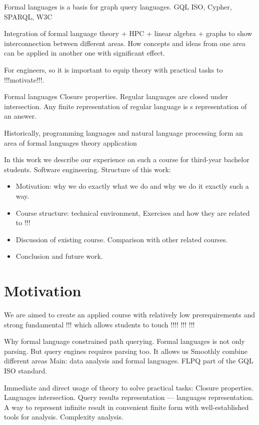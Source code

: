 \documentclass[sigconf]{acmart}
\begin{document}
Formal languages is a basis for graph query languages. 
GQL ISO, Cypher, SPARQL, W3C 

Integration of formal language theory + HPC + linear algebra + graphs to show interconnection between different areas.
How concepts and ideas from one area can be applied in another one with significant effect. 

For engineers, so it is important to equip theory with practical tasks to !!!motivate!!!. 

Formal languages Closure properties. Regular languages are closed under intersection. Any finite representation of regular language is s representation of an answer.

Historically, programming languages and natural language processing form an area of formal languages theory application 

In this work we describe our experience on such a course for third-year bachelor students.
Software engineering.
Structure of this work:
\begin{itemize}
  \item Motivation: why we do exactly what we do and why we do it exactly such a way. 
  \item Course structure: technical environment, Exercises and how they are related to !!!
  \item Discussion of existing course. Comparison with other related courses.
  \item Conclusion and future work.
\end{itemize}  

\section{Motivation}

We are aimed to create an applied course with relatively low prerequirements and strong fundamental !!! which allows students to touch !!!! !!! !!!

Why formal language constrained path querying. 
Formal languages is not only parsing.
But query engines requires parsing too.
It allows us Smoothly combine different areas 
Main: data analysis and formal languages.
FLPQ part of the GQL ISO standard.

Immediate and direct usage of theory to solve practical tasks: Closure properties.
Languages intersection.
Query results representation --- languages representation.
A way to represent infinite result in convenient finite form with well-established tools for analysis.
Complexity analysis.
\end{document}

